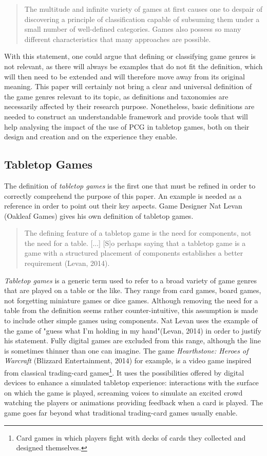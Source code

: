 \begin{quotation}
The multitude and infinite variety of games at first causes one to despair of discovering a principle of classification capable of subsuming them under a small number of well-defined categories. Games also possess so many different characteristics that many approaches are possible.
\end{quotation}

With this statement, one could argue that defining or classifying game genres is not relevant, as there will always be examples that do not fit the definition, which will then need to be extended and will therefore move away from its original meaning. This paper will certainly not bring a clear and universal definition of the game genres relevant to its topic, as definitions and taxonomies are necessarily affected by their research purpose. Nonetheless, basic definitions are needed to construct an understandable framework and provide tools that will help analysing the impact of the use of PCG in tabletop games, both on their design and creation and on the experience they enable.

\subsection{Tabletop Games}
The definition of \textit{tabletop games} is the first one that must be refined in order to correctly comprehend the purpose of this paper. An example is needed as a reference in order to point out their key aspects. Game Designer Nat Levan (Oakleaf Games) gives his own definition of tabletop games. 

\begin{quotation}
The defining feature of a tabletop game is the need for components, not the need for a table. [...] [S]o perhaps saying that a tabletop game is a game with a structured placement of components establishes a better requirement (Levan, 2014)\cite{web:oak}.
\end{quotation}

\textit{Tabletop games} is a generic term used to refer to a broad variety of game genres that are played on a table or the like. They range from card games, board games, not forgetting miniature games or dice games. Although removing the need for a table from the definition seems rather counter-intuitive, this assumption is made to include other simple games using components. 
Nat Levan uses the example of the game of "guess what I'm holding in my hand"(Levan, 2014)\cite{web:oak} in order to justify his statement. Fully digital games are excluded from this range, although the line is sometimes thinner than one can imagine. The game \textit{Hearthstone: Heroes of Warcraft} (Blizzard Entertainment, 2014) for example, is a video game inspired from classical trading-card games\footnote{Card games in which players fight with decks of cards they collected and designed themselves.}. 
It uses the possibilities offered by digital devices to enhance a simulated tabletop experience: interactions with the surface on which the game is played, screaming voices to simulate an excited crowd watching the players or animations providing feedback when a card is played. The game goes far beyond what traditional trading-card games usually enable.

